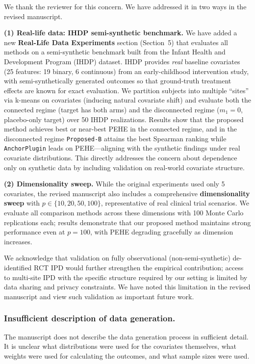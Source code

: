 {\color{blue}
We thank the reviewer for this concern. We have addressed it in two ways in the revised manuscript.

\textbf{(1) Real-life data: IHDP semi-synthetic benchmark.}
We have added a new \textbf{Real-Life Data Experiments} section (Section~5) that evaluates all methods on a semi-synthetic benchmark built from the Infant Health and Development Program (IHDP) dataset. IHDP provides \emph{real} baseline covariates (25 features: 19 binary, 6 continuous) from an early-childhood intervention study, with semi-synthetically generated outcomes so that ground-truth treatment effects are known for exact evaluation. We partition subjects into multiple ``sites'' via k-means on covariates (inducing natural covariate shift) and evaluate both the connected regime (target has both arms) and the disconnected regime ($m_1=0$, placebo-only target) over 50 IHDP realizations. Results show that the proposed method achieves best or near-best PEHE in the connected regime, and in the disconnected regime \texttt{Proposed-B} attains the best Spearman ranking while \texttt{AnchorPlugin} leads on PEHE---aligning with the synthetic findings under real covariate distributions. This directly addresses the concern about dependence only on synthetic data by including validation on real-world covariate structure.

\textbf{(2) Dimensionality sweep.}
While the original experiments used only 5 covariates, the revised manuscript also includes a comprehensive \textbf{dimensionality sweep} with $p \in \{10, 20, 50, 100\}$, representative of real clinical trial scenarios. We evaluate all comparison methods across these dimensions with 100 Monte Carlo replications each; results demonstrate that our proposed method maintains strong performance even at $p=100$, with PEHE degrading gracefully as dimension increases.

We acknowledge that validation on fully observational (non-semi-synthetic) de-identified RCT IPD would further strengthen the empirical contribution; access to multi-site IPD with the specific structure required by our setting is limited by data sharing and privacy constraints. We have noted this limitation in the revised manuscript and view such validation as important future work.
}

\subsubsection{Insufficient description of data generation.}  
The manuscript does not describe the data generation process in sufficient detail. It is unclear what distributions were used for the covariates themselves, what weights were used for calculating the outcomes, and what sample sizes were used.

